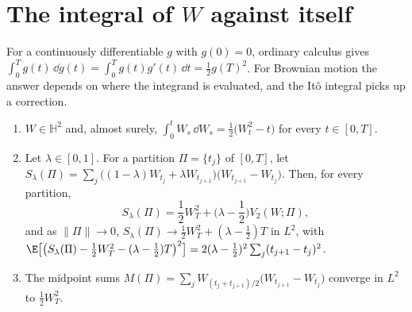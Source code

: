 \section{The integral of \texorpdfstring{$W$}{W} against itself}\label{sec:ito-wdw}

For a continuously differentiable $g$ with $g(0)=0$, ordinary calculus gives
$\int_0^Tg(t)\,\dd g(t)=\int_0^Tg(t)g'(t)\,\dd t=\frac12g(T)^2$. For Brownian motion the answer
depends on where the integrand is evaluated, and the It\^o integral picks up a correction.

\begin{proposition}[$\int_0^TW\,\dd W$]\label{prop:ito-wdw}
\leavevmode
\begin{enumerate}[label=(\roman*)]
  \item $W\in\mathbb H^2$ and, almost surely,
    $\displaystyle\int_0^tW_s\,\dd W_s=\frac12\big(W_t^2-t\big)$ for every $t\in[0,T]$.
  \item Let $\lambda\in[0,1]$. For a partition $\Pi=\{t_j\}$ of $[0,T]$, let
    $S_\lambda(\Pi)=\sum_j\big((1-\lambda)W_{t_j}+\lambda W_{t_{j+1}}\big)\big(W_{t_{j+1}}-W_{t_j}\big)$.
    Then, for every partition,
    \begin{equation}\label{eq:ito-lambda}
      S_\lambda(\Pi)=\frac12W_T^2+\Big(\lambda-\frac12\Big)V_2(W;\Pi),
    \end{equation}
    and as $\|\Pi\|\to0$, $S_\lambda(\Pi)\to\frac12W_T^2+(\lambda-\frac12)T$ in $L^2$, with
    $\E\big[\big(S_\lambda(\Pi)-\frac12W_T^2-(\lambda-\frac12)T\big)^2\big]
    =2(\lambda-\frac12)^2\sum_j(t_{j+1}-t_j)^2$.
  \item The midpoint sums
    $M(\Pi)=\sum_jW_{(t_j+t_{j+1})/2}\big(W_{t_{j+1}}-W_{t_j}\big)$ converge in $L^2$ to
    $\frac12W_T^2$.
\end{enumerate}
\end{proposition}

